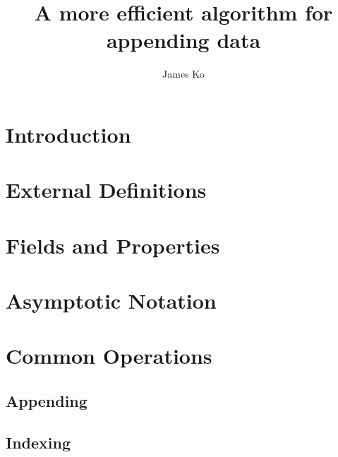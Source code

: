 \documentclass{article}
\title{A more efficient algorithm for appending data}
\author{James Ko}
\begin{document}
	\begin{titlepage}
		\maketitle
	\end{titlepage}
	
	\tableofcontents
	\newpage
	
	\begin{abstract}
		
	\end{abstract}

	\section{Introduction}

	
	
	\section{External Definitions}
	
	
	
	\section{Fields and Properties}
	
	
	
	\section{Asymptotic Notation}
	
	
	
	\section{Common Operations}
	
	
	
	\subsection{Appending}
	
	
	
	
	
	
	
	
	
	\subsection{Indexing}
	
\end{document}
